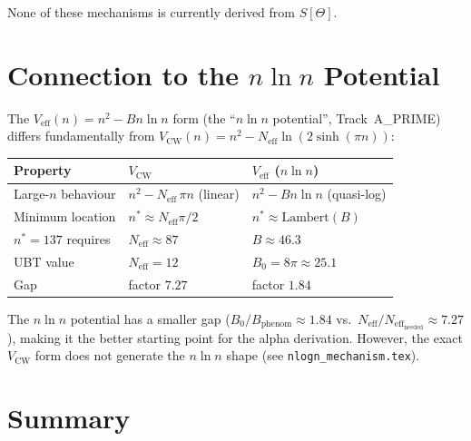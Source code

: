 \documentclass[12pt,a4paper]{article}
\theoremstyle{definition}
\theoremstyle{remark}
\newcommand{\Veff}{V_{\mathrm{eff}}}
\newcommand{\Neff}{N_{\mathrm{eff}}}
\newcommand{\VCW}{V_{\mathrm{CW}}}
\begin{document}
None of these mechanisms is currently derived from $S[\Theta]$.

\section{Connection to the $n\ln n$ Potential}
\label{sec:vcw:nlogn}

The $\Veff(n) = n^2 - Bn\ln n$ form (the ``$n\ln n$ potential'', Track~A\_PRIME)
differs fundamentally from $\VCW(n) = n^2 - \Neff\ln(2\sinh(\pi n))$:

\begin{center}
\begin{tabular}{lll}
  \toprule
  Property & $\VCW$ & $\Veff$ ($n\ln n$) \\
  \midrule
  Large-$n$ behaviour & $n^2 - \Neff\,\pi n$ (linear) & $n^2 - Bn\ln n$ (quasi-log) \\
  Minimum location & $n^* \approx \Neff\pi/2$ & $n^* \approx \mathrm{Lambert}(B)$ \\
  $n^*=137$ requires & $\Neff \approx 87$ & $B \approx 46.3$ \\
  UBT value & $\Neff = 12$ & $B_0 = 8\pi \approx 25.1$ \\
  Gap & factor $7.27$ & factor $1.84$ \\
  \bottomrule
\end{tabular}
\end{center}

The $n\ln n$ potential has a smaller gap ($B_0/B_{\mathrm{phenom}} \approx 1.84$
vs.\ $\Neff/\Neff_{\mathrm{needed}} \approx 7.27$), making it the better
starting point for the alpha derivation.  However, the exact $\VCW$ form
does not generate the $n\ln n$ shape (see \texttt{nlogn\_mechanism.tex}).

\section{Summary}
\label{sec:vcw:summary}
\end{document}
